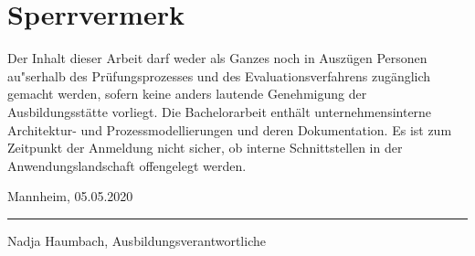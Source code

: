 \chapter*{Sperrvermerk}
Der Inhalt dieser Arbeit darf weder als Ganzes noch in Auszügen Personen au"serhalb des Prüfungsprozesses und des Evaluationsverfahrens zugänglich gemacht werden, sofern keine anders lautende Genehmigung der Ausbildungsstätte vorliegt. Die Bachelorarbeit enthält unternehmensinterne Architektur- und Prozessmodellierungen und deren Dokumentation. Es ist zum Zeitpunkt der Anmeldung nicht sicher, ob interne Schnittstellen in der Anwendungslandschaft offengelegt werden.


\vspace{3cm}
\noindent Mannheim, 05.05.2020\hfill\rule{8.4cm}{.4pt}\par
\noindent\hfill Nadja Haumbach, Ausbildungsverantwortliche
\cleardoublepage

